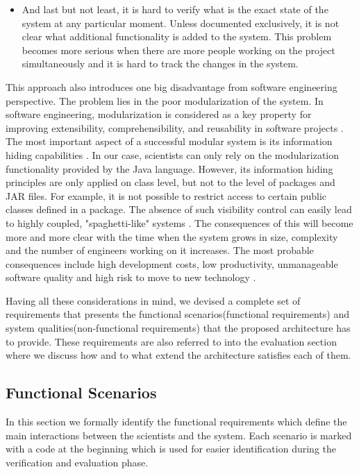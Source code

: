 \begin{itemize}
	\item And last but not least, it is hard to verify what is the exact state of the system at any particular moment. Unless documented exclusively, it is not clear what additional functionality is added to the system. This problem becomes more serious when there are more people working on the project simultaneously and it is hard to track the changes in the system.
		
\end{itemize}

This approach also introduces one big disadvantage from software engineering perspective. The problem lies in the poor modularization of the system. In software engineering, modularization is considered as a key property for improving extensibility, comprehensibility, and reusability in software projects \cite{Parnas}. The most important aspect of a successful modular system is its information hiding capabilities \cite{Srivastava}. In our case, scientists can only rely on the modularization functionality provided by the Java language. However, its information hiding principles are only applied on class level, but not to the level of packages and JAR files. For example, it is not possible to restrict access to certain public classes defined in a package. The absence of such visibility control can easily lead to highly coupled, "spaghetti-like" systems \cite{Eder}. The consequences of this will become more and more clear with the time when the system grows in size, complexity and the number of engineers working on it increases. The most probable consequences include high development costs, low productivity, unmanageable software quality and high risk to move to new technology \cite{Cai}.

Having all these considerations in mind, we devised a complete set of requirements that presents the functional scenarios(functional requirements) and system qualities(non-functional requirements) that the proposed architecture has to provide. These requirements are also referred to into the evaluation section where we discuss how and to what extend the architecture satisfies each of them.


\subsection{Functional Scenarios}
In this section we formally identify the functional requirements which define the main interactions between the scientists and the system. Each scenario is marked with a code at the beginning which is used for easier identification during the verification and evaluation phase.

